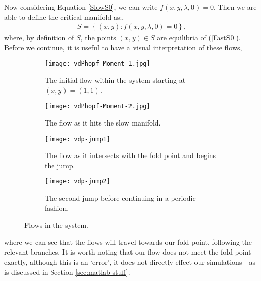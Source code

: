 Now considering Equation \ref{SlowS0}, we can write $f(x,y,\lambda, 0)=0$. Then we are able to define the critical manifold as:,
\begin{align} \label{CriticalS}
S= \left\{ (x,y) : f(x,y,\lambda, 0)=0 \right \},
\end{align}
where, by definition of $S$, the points $(x,y) \in S$ are equilibria of (\ref{FastS0}). Before we continue, it is useful to have a visual interpretation of these flows,
\begin{figure}[h!]\centering

	\begin{subfigure}[t]{0.45\textwidth}
		\centering
		\texttt{[image: vdPhopf-Moment-1.jpg]}
		\caption{The initial flow within the system starting at $ (x,y)=(1,1) $.}
	\end{subfigure}
	\hfill
	\begin{subfigure}[t]{0.45\textwidth}
		\centering
		\texttt{[image: vdPhopf-Moment-2.jpg]}
		\caption{The flow as it hits the slow manifold.}
	\end{subfigure}

	\vspace{1cm}
	\begin{subfigure}[t]{0.45\textwidth}
		\centering
		\texttt{[image: vdp-jump1]}
		\caption{The flow as it intersects with the fold point and begins the jump.}
	\end{subfigure}
	\hfill
	\begin{subfigure}[t]{0.45\textwidth}\centering
		\texttt{[image: vdp-jump2]}
		\caption{The second jump before continuing in a periodic fashion.}
	\end{subfigure}
	\caption{Flows in the \vdp system.}
	\label{fig: vdp flow diagram}
\end{figure}\newline
where we can see that the flows will travel towards our fold point, following the relevant branches. It is worth noting that our flow does not meet the fold point exactly, although this is an `error', it does not directly effect our simulations - as is discussed in Section \ref{sec:matlab-stuff}.
